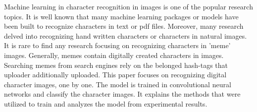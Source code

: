 Machine learning in character recognition in images is one of the popular research topics. It is well known that many machine learning
packages or models have been built to recognize characters in text or pdf files. Moreover, many research delved into recognizing
hand written characters or characters in natural images. It is rare to find any research focusing on recognizing characters in
'meme' images. Generally, memes contain digitally created characters in images. Searching memes from search engines rely on the
belonged hash-tags that uploader additionally uploaded. This paper focuses on recognizing digital character images, one by one. The model
is trained in convolutional neural networks and classify the character images. It explains the methods that were utilized to train and
analyzes the model from experimental results.